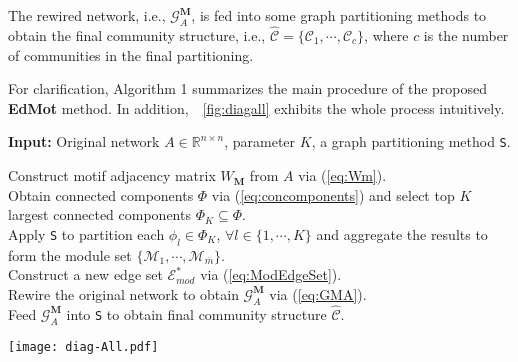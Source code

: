\documentclass[sigconf]{acmart}
\begin{document}
The rewired network, i.e., $\mathcal{G}_{A}^{\mathbf{M}}$, is fed into some graph partitioning methods to obtain the final community structure, i.e., $\mathcal{\widehat{C}} = \{ \mathcal{C}_{1}, \cdots, \mathcal{C}_{c}\}$, where $c$ is the number of communities in the final partitioning.

For clarification, Algorithm 1 summarizes the main procedure of the proposed \textbf{EdMot} method. In addition,~\figurename~\ref{fig:diagall} exhibits the whole process intuitively.

\begin{algorithm}[htb]
\caption{The proposed \textbf{EdMot} approach.}
\label{alg:Framwork}
{\bfseries Input:} Original network $A\in \mathbb{R}^{n \times n}$, parameter $K$, a graph partitioning method \texttt{S}.
\begin{algorithmic}[1]
\STATE Construct motif adjacency matrix $W_{\mathbf{M}}$ from $A$ via (\ref{eq:Wm}).\\
\STATE Obtain connected components $\Phi$ via (\ref{eq:concomponents}) and select top $K$ largest connected components $\Phi_{K} \subseteq \Phi $.\\
\STATE Apply \texttt{S} to partition each $\phi_{l} \in \Phi_{K}$, $\forall l \in \{1,\cdots, K\}$ and aggregate the results to form the module set $\{\mathcal{M}_{1},\cdots, \mathcal{M}_{\bar{m}}\}$.\\
\STATE Construct a new edge set $\mathcal{E}^{*}_{mod}$ via (\ref{eq:ModEdgeSet}).\\
\STATE Rewire the original network to obtain $\mathcal{G}_{A}^{\mathbf{M}}$ via (\ref{eq:GMA}).\\
\STATE Feed $\mathcal{G}_{A}^{\mathbf{M}}$ into \texttt{S} to obtain final community structure $\mathcal{\widehat{C}}$.\\
\end{algorithmic}
\end{algorithm}

\begin{figure*}[!t]
\centering \texttt{[image: diag-All.pdf]}\caption{Illustration of the proposed \textbf{EdMot} algorithm. A synthetic network is designed to serve as the original network, where nodes and edges in three communities are denoted with different colors and the black edges represent the inter-community edges. Specifically, by constructing the motif-based hypergraph in step 1, the hypergraph fragmentation issue arises, where two connected components and three isolated nodes are generated in the hypergraph. By partitioning the largest connected component into modules in step 2, two modules can be identified and a new edge set is constructed to derive a clique from each module, as shown as the dashed line. By rewiring the network in step 3, a rewired network can be obtained by substituting the new edge set into the original network. Finally, by partitioning the rewired network into communities, the community structure can be discovered.} \label{fig:diagall}\end{figure*}
\end{document}
